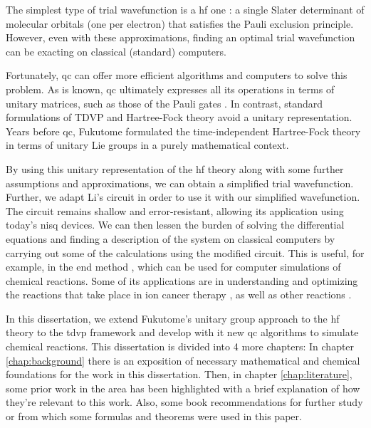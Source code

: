\documentclass{aux/ttuthes2007}
\begin{document}
The simplest type of trial wavefunction is a \gls{hf} one :
a single Slater determinant of molecular orbitals (one per electron) that satisfies the Pauli exclusion principle.
However, even with these approximations, finding an optimal trial wavefunction can be exacting on classical (standard) computers.

Fortunately, \gls{qc}  can offer more efficient algorithms and computers to solve this problem.
As is known, \gls{qc} ultimately expresses all its operations in terms of unitary matrices, such as those of the Pauli gates .
In contrast, standard formulations of TDVP and Hartree-Fock theory  avoid a unitary representation.
Years before \gls{qc}, Fukutome  formulated the time-independent Hartree-Fock theory in terms of unitary Lie groups  in a purely mathematical context.

By using this unitary representation of the \gls{hf} theory along with some further assumptions and approximations, we can obtain a simplified trial wavefunction.
Further, we adapt Li's circuit  in order to use it with our simplified wavefunction. The circuit remains shallow and error-resistant, allowing its application using today's \gls{nisq} devices.
We can then lessen the burden of solving the differential equations and finding a description of the system on classical computers by carrying out some of the calculations using the modified circuit.
This is useful, for example, in the \gls{end} method , which can be used for computer simulations of chemical reactions.
Some of its applications are in understanding and optimizing the reactions that take place in ion cancer therapy , as well as other reactions .

In this dissertation, we extend Fukutome’s unitary group approach to the \gls{hf} theory to the \gls{tdvp} framework and develop with it new \gls{qc} algorithms to simulate chemical reactions.
This dissertation is divided into 4 more chapters: In chapter \ref{chap:background} there is an exposition of necessary mathematical and chemical foundations for the work in this dissertation.
Then, in chapter \ref{chap:literature}, some prior work in the area has been highlighted with a brief explanation of how they're relevant to this work.
Also, some book recommendations for further study or from which some formulas and theorems were used in this paper.
\end{document}
